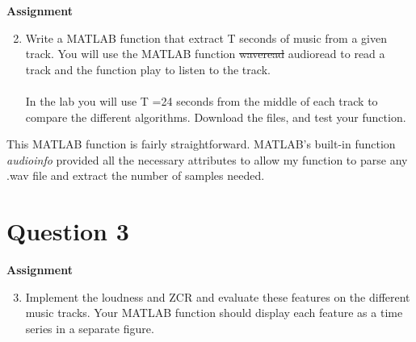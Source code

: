 \documentclass[11pt]{article} %
\begin{document}
\begin{framed}
\textbf{Assignment}
\begin{enumerate}
\setcounter{enumi}{1}
\item Write a MATLAB function that extract T seconds of music from a given track. You
will use the MATLAB function \sout{waveread} audioread to read a track and the function play to
listen to the track.\\\\
In the lab you will use T =24 seconds from the middle of each track to compare the
different algorithms. Download the files, and test your function.
\end{enumerate}
\end{framed}

This MATLAB function is fairly straightforward. MATLAB's built-in function \textit{audioinfo} provided all the necessary attributes to allow my function to parse
any .wav file and extract the number of samples needed. 

\section{Question 3}
\begin{framed}
\textbf{Assignment}
\begin{enumerate}
\setcounter{enumi}{2}
\item Implement the loudness and ZCR and evaluate these features on the different music
tracks. Your MATLAB function should display each feature as a time series in a separate
figure.
\end{enumerate}
\end{framed}
\end{document}
